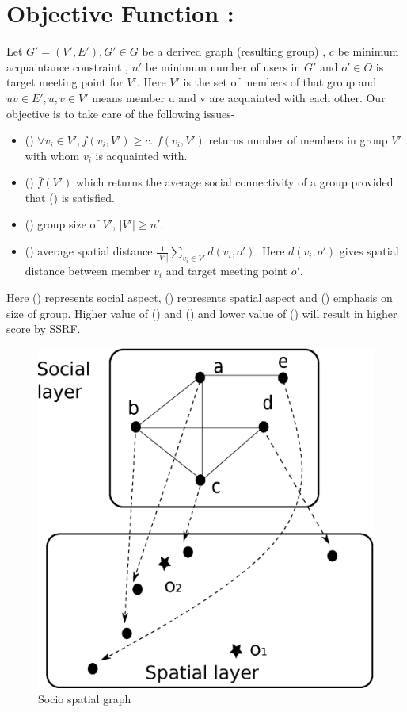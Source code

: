\documentclass{vldb}
\begin{document}
		\section{Objective Function :} Let $ G'=(V',E'),G' \in G $ be a derived graph (resulting group) , $ c $ be minimum acquaintance constraint , $ n' $ be  minimum number of users in $ G' $ and $o' \in  O $ is target meeting point for $ V' $. Here  $ V' $ is the set of members of that group and $ uv \in E', u,v \in V' $ means member u and v are acquainted with each other. Our objective is to take care of the following issues-
		\begin{itemize}
		\item[] ()  $\forall v_i \in V', f(v_i,V') \geq c  $. $ f(v_i,V')$ returns number of members in group $ V' $ with whom $ v_i $ is acquainted with.
		
		\item[] ()   $ \bar{f}(V') $ which returns the average social connectivity of a group provided that  () is satisfied.
		\item[] ()  group size of $ V' $, $ |V'| \geq n' $.
		\item[] ()   average spatial distance $  \frac{1}{|V'|} \sum_{v_i \in V'} d(v_i,o') $. Here $ d(v_i,o') $ gives spatial distance between member $ v_i $ and target meeting point $ o' $.
		
		\end{itemize}   
		Here () represents social aspect, () represents spatial aspect and () emphasis on size of group.  Higher value of  () and () and lower value of () will result in higher score by SSRF.
		
		
		
		 
		
		
		\begin{figure}[t]
				\centerline{\includegraphics[width=.4\columnwidth]{drawing2}}
				\caption{Socio spatial graph}
				\label{fig:graph1}
		\end{figure}
		
\end{document}
